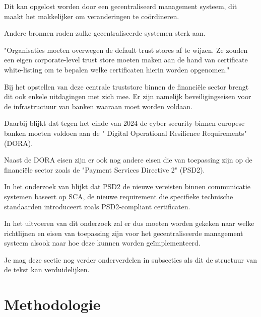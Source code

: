 Dit kan opgelost worden door een gecentraliseerd management systeem, dit maakt het makkelijker om veranderingen te coördineren.

Andere bronnen raden zulke gecentraliseerde systemen sterk aan.

"Organisaties moeten overwegen de default trust stores af te wijzen. Ze zouden een eigen corporate-level trust store moeten maken aan de hand van certificate white-listing om te bepalen welke certificaten hierin worden opgenomen." \autocite{Venafi}

Bij het opstellen van deze centrale truststore binnen de financiële sector brengt dit ook enkele uitdagingen met zich mee. Er zijn namelijk beveiligingseisen voor de infrastructuur van banken waaraan moet worden voldaan.

Daarbij blijkt dat tegen het einde van 2024 de cyber security binnen europese banken moeten voldoen aan de " Digital Operational Resilience Requirements" (DORA). \autocite{Gorobeț2024Convergence}

Naast de DORA eisen zijn er ook nog andere eisen die van toepassing zijn op de financiële sector zoals de "Payment Services Directive 2" (PSD2).

In het onderzoek van \textcite{Gounari2024} blijkt dat PSD2 de nieuwe vereisten binnen communicatie systemen baseert op SCA, de nieuwe requirement die specifieke technische standaarden introduceert zoals PSD2-compliant certificaten.

In het uitvoeren van dit onderzoek zal er dus moeten worden gekeken naar welke richtlijnen en eisen van toepassing zijn voor het gecentraliseerde management systeem alsook naar hoe deze kunnen worden geïmplementeerd.


Je mag deze sectie nog verder onderverdelen in subsecties als dit de structuur van de tekst kan verduidelijken.

\section{Methodologie}%
\label{sec:methodologie}

